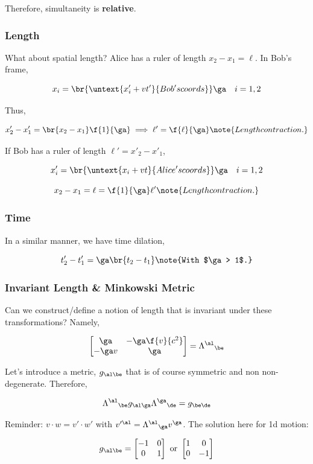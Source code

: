 \documentclass{article}
\newcommand{\mtrx}[1]{
    \begin{bmatrix}
    #1
    \end{bmatrix}
}
\begin{document}
Therefore, simultaneity is \textbf{relative}.

\subsubsection{Length}

What about spatial length? Alice has a ruler of length $x_2 - x_1 = \ell$. In Bob's frame,

\[ x_i = \br{\untext{x'_i + v t'}{Bob's coords}} \ga \quad i = 1,2 \]

Thus,

\[ x'_2 - x'_1 = \br{x_2 - x_1} \f{1}{\ga} \implies \ell' = \f{\ell}{\ga} \note{Length contraction.}\]

If Bob has a ruler of length $\ell' = x'_2 - x'_1$,

\[ x'_i = \br{\untext{x_i + v t}{Alice's coords}} \ga \quad i = 1,2 \]

\[ x_2 - x_1 = \ell = \f{1}{\ga}\ell'\note{Length contraction.}\]

\subsubsection{Time}

In a similar manner, we have time dilation,

\[ t'_2 - t'_1 = \ga \br{t_2 - t_1} \note{With $\ga > 1$.} \]

\subsubsection{Invariant Length \& Minkowski Metric}

Can we construct/define a notion of length that is invariant under these transformations? Namely,

\newcommand{\Lam}{\Lambda}

\[ \mtrx{\ga & -\ga \f{v}{c^2} \\ -\ga v & \ga} = {\Lam^{\al}}_{\be} \]

Let's introduce a metric, $g_{\al\be}$ that is of course symmetric and non non-degenerate. Therefore,

\[ {\Lam^{\al}}_{\be} g_{\al\ga} {\Lam^{\ga}}_{\de} = g_{\be\de}  \]

Reminder: $v \cdot w = v' \cdot w'$ with $v'^\al = {\Lam^{\al}}_{\ga} v^\ga$. The solution here for 1d motion:

\[ g_{\al\be} = \mtrx{-1 & 0 \\ 0 & 1} \text{ or } \mtrx{1 & 0 \\ 0 & -1} \]
\end{document}
